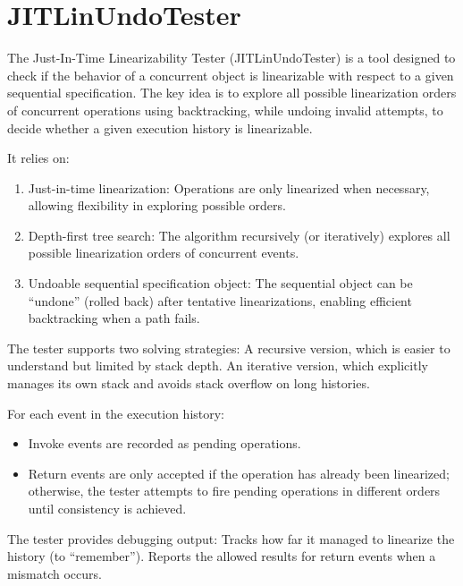 \documentclass[12pt]{article}
\begin{document}
\section{JITLinUndoTester}

	The Just-In-Time Linearizability Tester (JITLinUndoTester)
   is a tool designed to check if the behavior of a concurrent object
    is linearizable with respect to a given sequential specification.
    The key idea is to explore all possible linearization 
    orders of concurrent operations using backtracking, 
    while undoing invalid attempts, 
    to decide whether a given execution history is linearizable.

	It relies on:
  \begin{enumerate}
    \item Just-in-time linearization: Operations are only linearized 
    when necessary, allowing flexibility in exploring possible orders.
	  \item Depth-first tree search: The algorithm recursively 
    (or iteratively) explores all possible linearization orders of concurrent events.
	  \item Undoable sequential specification object:
     The sequential object can be “undone” (rolled back) 
     after tentative linearizations, enabling efficient backtracking when a path fails.
  \end{enumerate}

	The tester supports two solving strategies:
	A recursive version, which is easier to understand but limited by stack depth.
	An iterative version, which explicitly manages its own stack
   and avoids stack overflow on long histories.
	
  For each event in the execution history:
  \begin{itemize}
    \item Invoke events are recorded as pending operations.
	  \item Return events are only accepted if the operation has
   already been linearized; otherwise, the tester
    attempts to fire pending operations in different
     orders until consistency is achieved.
  \end{itemize}
	The tester provides debugging output:
	Tracks how far it managed to linearize the history (to ``remember'').
	Reports the allowed results for return events when a mismatch occurs.
	
\end{document}
